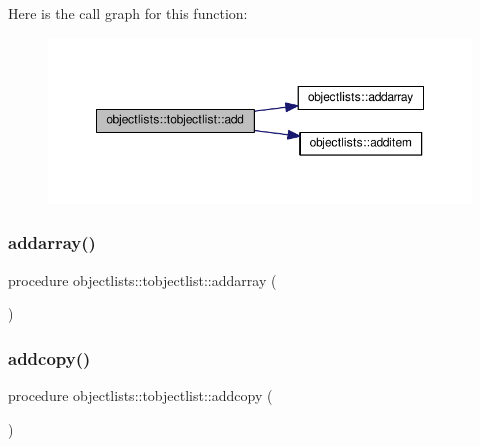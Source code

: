 Here is the call graph for this function\+:
\nopagebreak
\begin{figure}[H]
\begin{center}
\leavevmode
\includegraphics[width=350pt]{structobjectlists_1_1tobjectlist_a4239d36f00d83e31e90be3277d604978_cgraph}
\end{center}
\end{figure}
\mbox{\label{structobjectlists_1_1tobjectlist_a46a5b2bc5a1fd09b586cfc2f721d792b}} 
\subsubsection{\texorpdfstring{addarray()}{addarray()}}
{\footnotesize\ttfamily procedure objectlists\+::tobjectlist\+::addarray (\begin{DoxyParamCaption}{ }\end{DoxyParamCaption})\hspace{0.3cm}{\ttfamily [private]}}

\mbox{\label{structobjectlists_1_1tobjectlist_a4b745e6ef7a0e708b2ab647fa7b8791a}} 
\subsubsection{\texorpdfstring{addcopy()}{addcopy()}}
{\footnotesize\ttfamily procedure objectlists\+::tobjectlist\+::addcopy (\begin{DoxyParamCaption}{ }\end{DoxyParamCaption})\hspace{0.3cm}{\ttfamily [private]}}

